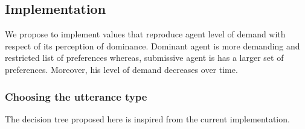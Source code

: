 \documentclass{article}
\begin{document}
	\subsection{Implementation}
	We propose to implement values that reproduce agent level of demand with respect of its perception of dominance. Dominant agent is more demanding and restricted list of preferences whereas, submissive agent is has a larger set of preferences. Moreover, his level of demand decreases over time.
	
	\subsubsection{Choosing the utterance type}
	The decision tree proposed here is inspired from the current implementation. 
	
%		
%			
%			
%		
%			
\end{document}
